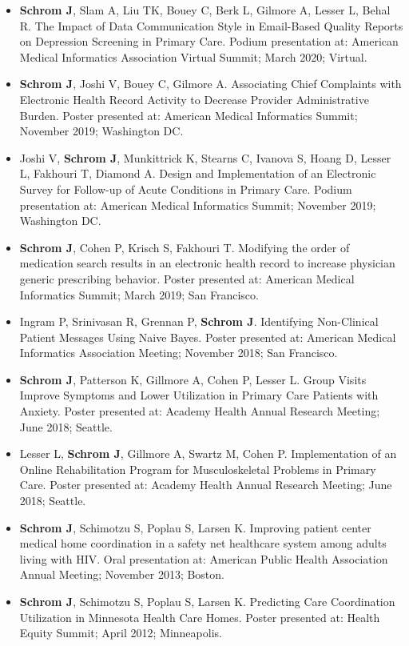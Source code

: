 \documentclass[11pt]{article}
\begin{document}
\begin{itemize}
    \item \textbf{Schrom J}, Slam A, Liu TK, Bouey C, Berk L, Gilmore A, Lesser L, Behal R. The Impact of Data Communication Style in Email-Based Quality Reports on Depression Screening in Primary Care. Podium presentation at: American Medical Informatics Association Virtual Summit; March 2020; Virtual. 
    \item \textbf{Schrom J}, Joshi V, Bouey C, Gilmore A. Associating Chief Complaints with Electronic Health Record Activity to Decrease Provider Administrative Burden. Poster presented at: American Medical Informatics Summit; November 2019; Washington DC. 
    \item Joshi V, \textbf{Schrom J}, Munkittrick K, Stearns C, Ivanova S, Hoang D, Lesser L, Fakhouri T, Diamond A. Design and Implementation of an Electronic Survey for Follow-up of Acute Conditions in Primary Care. Podium presentation at: American Medical Informatics Summit; November 2019; Washington DC. 
    \item \textbf{Schrom J}, Cohen P, Krisch S, Fakhouri T. Modifying the order of medication search results in an electronic health record to increase physician generic prescribing behavior. Poster presented at: American Medical Informatics Summit; March 2019; San Francisco. 
    \item Ingram P, Srinivasan R, Grennan P, \textbf{Schrom J}. Identifying Non-Clinical Patient Messages Using Naive Bayes. Poster presented at: American Medical Informatics Association Meeting; November 2018; San Francisco.
    \item \textbf{Schrom J}, Patterson K, Gillmore A, Cohen P, Lesser L. Group Visits Improve Symptoms and Lower Utilization in Primary Care Patients with Anxiety. Poster presented at: Academy Health Annual Research Meeting; June 2018; Seattle. 
    \item Lesser L, \textbf{Schrom J}, Gillmore A, Swartz M, Cohen P. Implementation of an Online Rehabilitation Program for Musculoskeletal Problems in Primary Care. Poster presented at: Academy Health Annual Research Meeting; June 2018; Seattle. 
    \item \textbf{Schrom J}, Schimotzu S, Poplau S, Larsen K. Improving patient center medical home coordination in a safety net healthcare system among adults living with HIV. Oral presentation at: American Public Health Association Annual Meeting; November 2013; Boston. 
    \item \textbf{Schrom J}, Schimotzu S, Poplau S, Larsen K. Predicting Care Coordination Utilization in Minnesota Health Care Homes. Poster presented at: Health Equity Summit; April 2012; Minneapolis.
\end{itemize}
\end{document}
